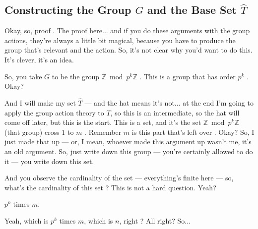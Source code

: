 \begin{proofWrapper}

\subsection{Constructing the Group \texorpdfstring{$G$}{G} and the Base Set \texorpdfstring{$\widehat{T}$}{T-hat}}

\begin{speech}[00:28:14 - 00:29:38]
Okay, so, proof . The proof here... and if you do these arguments with the group actions, they're always a little bit magical, because you have to produce the group that's relevant and the action. So, it's not clear why you'd want to do this. It's clever, it's an idea.

So, you take $G$ to be the group $\mathbb{Z} \bmod p^k \mathbb{Z}$ . This is a group that has order $p^k$ . Okay?

And I will make my set $\widehat{T}$  --- and the hat means it's not... at the end I'm going to apply the group action theory to $T$, so this is an intermediate, so the hat will come off later, but this is the start. This is a set, and it's the set $\mathbb{Z} \bmod p^k \mathbb{Z}$ (that group) cross $1$ to $m$ . Remember $m$ is this part that's left over . Okay? So, I just made that up --- or, I mean, whoever made this argument up wasn't me, it's an old argument. So, just write down this group --- you're certainly allowed to do it --- you write down this set.

And you observe the cardinality of the set --- everything's finite here --- so, what's the cardinality of this set ? This is not a hard question. Yeah?
\end{speech}

\begin{student}
$p^k$ times $m$.
\end{student}

\begin{speech}[00:29:39 - 00:29:46]
Yeah, which is $p^k$ times $m$, which is $n$, right ? All right? So...
\end{speech}


\end{proofWrapper}
